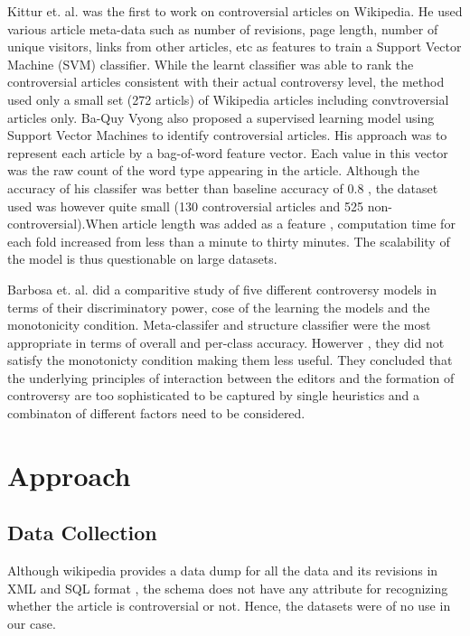 \documentclass[twocolumn]{article}
\begin{document}
   Kittur et. al. was the first to work on controversial articles on
Wikipedia. He used various article meta-data such as number of
revisions, page length, number of unique visitors, links from other
articles, etc as features to train a Support Vector Machine (SVM)
classifier. While the learnt classifier was able to rank the
controversial articles consistent with their actual controversy level,
the method used only a small set (272 articls) of Wikipedia articles
including convtroversial articles only.  Ba-Quy Vyong also proposed a
supervised learning model using Support Vector Machines to identify
controversial articles. His approach was to represent each article by
a bag-of-word feature vector. Each value in this vector was the raw
count of the word type appearing in the article. Although the accuracy
of his classifer was better than baseline accuracy of 0.8 , the
dataset used was however quite small (130 controversial articles and
525 non-controversial).When article length was added as a feature ,
computation time for each fold increased from less than a minute to
thirty minutes. The scalability of the model is thus questionable on
large datasets.

   Barbosa et. al. did a comparitive study of five different
controversy models in terms of their discriminatory power, cose of the
learning the models and the monotonicity condition.  Meta-classifer
and structure classifier were the most appropriate in terms of overall
and per-class accuracy. Howerver , they did not satisfy the
monotonicty condition making them less useful. They concluded that the
underlying principles of interaction between the editors and the
formation of controversy are too sophisticated to be captured by
single heuristics and a combinaton of different factors need to be
considered.


\section{Approach}

\subsection{Data Collection}

Although wikipedia provides a data dump for all the data and its
revisions in XML and SQL format , the schema does not have any
attribute for recognizing whether the article is controversial or not.
Hence, the datasets were of no use in our case. 
\end{document}
